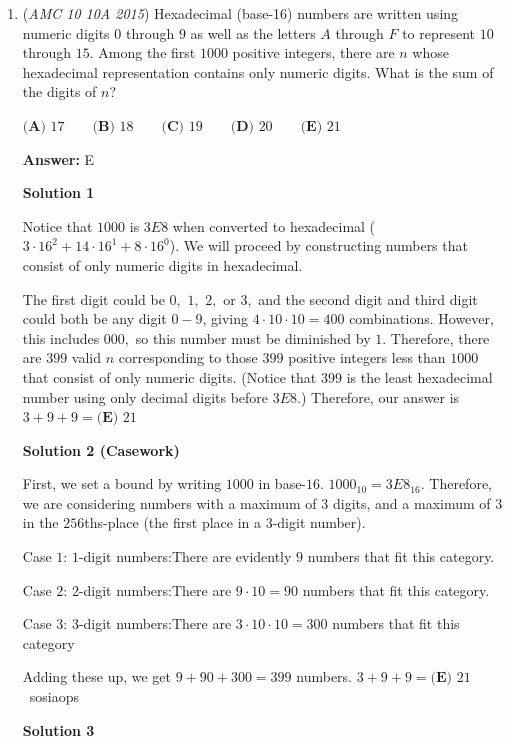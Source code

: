 \begin{enumerate}
 


	\item (\textit{AMC 10 10A 2015}) Hexadecimal (base-16) numbers are written using numeric digits $0$ through $9$ as well as the letters $A$ through $F$ to represent $10$ through $15$. Among the first $1000$ positive integers, there are $n$ whose hexadecimal representation contains only numeric digits. What is the sum of the digits of $n$?


 $\textbf{(A) }17\qquad\textbf{(B) }18\qquad\textbf{(C) }19\qquad\textbf{(D) }20\qquad\textbf{(E) }21$

 \textbf{Answer: }E



\textbf{Solution 1}

Notice that $1000$ is $3E8$ when converted to hexadecimal ($3 \cdot 16^2 + 14 \cdot 16^1 + 8 \cdot 16^0$). We will proceed by constructing numbers that consist of only numeric digits in hexadecimal.

 The first digit could be $0,$ $1,$ $2,$ or $3,$ and the second digit and third digit could both be any digit $0 - 9$, giving $4 \cdot 10 \cdot 10 = 400$ combinations. However, this includes $000,$ so this number must be diminished by $1.$  Therefore, there are $399$ valid $n$ corresponding to those $399$ positive integers less than $1000$ that consist of only numeric digits.  (Notice that $399$ is the least hexadecimal number using only decimal digits before $3E8$.)  Therefore, our answer is $3 + 9 + 9 = \boxed{\textbf{(E) } 21}$




\textbf{Solution 2 (Casework)}

First, we set a bound by writing $1000$ in base-$16$. $1000_{10}=3E8_{16}$. Therefore, we are considering numbers with a maximum of $3$ digits, and a maximum of $3$ in the $256$ths-place (the first place in a $3$-digit number).

 Case $1$: $1$-digit numbers:There are evidently $9$ numbers that fit this category.

 Case $2$: $2$-digit numbers:There are $9\cdot10=90$ numbers that fit this category.

 Case $3$: $3$-digit numbers:There are $3\cdot10\cdot10=300$ numbers that fit this category

 Adding these up, we get $9+90+300=399$ numbers. $3 + 9 + 9 = \boxed{\textbf{(E) } 21}$ ~sosiaops

 



\textbf{Solution 3}


\end{enumerate}

